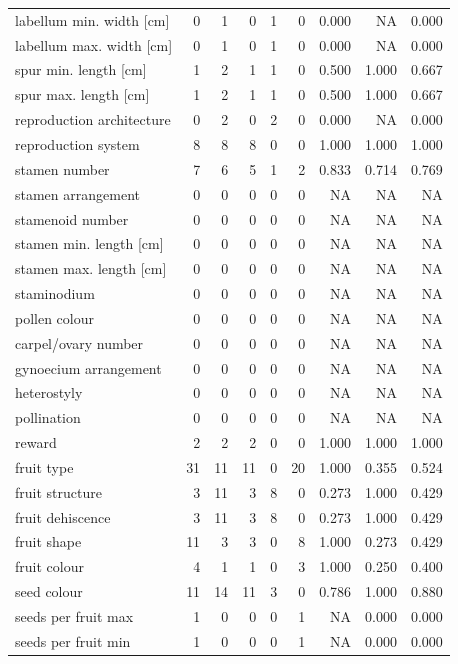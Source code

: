 \begin{longtable}{p{}rrrrrrrr}
labellum min. width [cm] & 0 & 1 & 0 & 1 & 0 & 0.000 & NA & 0.000 \\
labellum max. width [cm] & 0 & 1 & 0 & 1 & 0 & 0.000 & NA & 0.000 \\
spur min. length [cm] & 1 & 2 & 1 & 1 & 0 & 0.500 & 1.000 & 0.667 \\
spur max. length [cm] & 1 & 2 & 1 & 1 & 0 & 0.500 & 1.000 & 0.667 \\
reproduction architecture & 0 & 2 & 0 & 2 & 0 & 0.000 & NA & 0.000 \\
reproduction system & 8 & 8 & 8 & 0 & 0 & 1.000 & 1.000 & 1.000 \\
stamen number & 7 & 6 & 5 & 1 & 2 & 0.833 & 0.714 & 0.769 \\
stamen arrangement & 0 & 0 & 0 & 0 & 0 & NA & NA & NA \\
stamenoid number & 0 & 0 & 0 & 0 & 0 & NA & NA & NA \\
stamen min. length [cm] & 0 & 0 & 0 & 0 & 0 & NA & NA & NA \\
stamen max. length [cm] & 0 & 0 & 0 & 0 & 0 & NA & NA & NA \\
staminodium & 0 & 0 & 0 & 0 & 0 & NA & NA & NA \\
pollen colour & 0 & 0 & 0 & 0 & 0 & NA & NA & NA \\
carpel/ovary number & 0 & 0 & 0 & 0 & 0 & NA & NA & NA \\
gynoecium arrangement & 0 & 0 & 0 & 0 & 0 & NA & NA & NA \\
heterostyly & 0 & 0 & 0 & 0 & 0 & NA & NA & NA \\
pollination & 0 & 0 & 0 & 0 & 0 & NA & NA & NA \\
reward & 2 & 2 & 2 & 0 & 0 & 1.000 & 1.000 & 1.000 \\
fruit type & 31 & 11 & 11 & 0 & 20 & 1.000 & 0.355 & 0.524 \\
fruit structure & 3 & 11 & 3 & 8 & 0 & 0.273 & 1.000 & 0.429 \\
fruit dehiscence & 3 & 11 & 3 & 8 & 0 & 0.273 & 1.000 & 0.429 \\
fruit shape & 11 & 3 & 3 & 0 & 8 & 1.000 & 0.273 & 0.429 \\
fruit colour & 4 & 1 & 1 & 0 & 3 & 1.000 & 0.250 & 0.400 \\
seed colour & 11 & 14 & 11 & 3 & 0 & 0.786 & 1.000 & 0.880 \\
seeds per fruit max & 1 & 0 & 0 & 0 & 1 & NA & 0.000 & 0.000 \\
seeds per fruit min & 1 & 0 & 0 & 0 & 1 & NA & 0.000 & 0.000 \\

\end{longtable}
